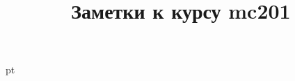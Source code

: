 \documentclass[pdftex,12pt,a4paper]{article}
\title{Заметки к курсу mc201}
\begin{document}
 pt %

\maketitle



%
%
\end{document}
